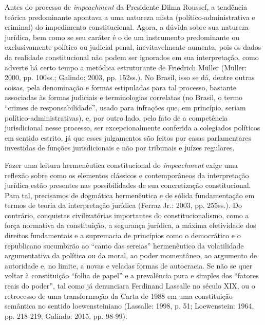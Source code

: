 Antes do processo de \emph{impeachment} da Presidente Dilma Roussef, a
tendência teórica predominante apontava a uma natureza mista
(político-administrativa e criminal) do impedimento constitucional.
Agora, a dúvida sobre sua natureza jurídica, bem como se seu caráter é o
de um instrumento predominante ou exclusivamente político ou judicial
penal, inevitavelmente aumenta, pois os dados da realidade
constitucional não podem ser ignorados em sua interpretação, como
adverte há certo tempo a metódica estruturante de Friedrich Müller
(Müller: 2000, pp. 100ss.; Galindo: 2003, pp. 152ss.). No Brasil, isso
se dá, dentre outras coisas, pela denominação e formas estipuladas para
tal processo, bastante associadas às formas judiciais e terminologias
correlatas (no Brasil, o termo ``crimes de responsabilidade'', usado
para infrações que, em princípio, seriam político-administrativas), e,
por outro lado, pelo fato de a competência jurisdicional nesse processo,
ser excepcionalmente conferida a colegiados políticos em sentido
estrito, já que esses julgamentos são feitos por casas parlamentares
investidas de funções jurisdicionais e não por tribunais e juízes
regulares.

Fazer uma leitura hermenêutica constitucional do \emph{impeachment}
exige uma reflexão sobre como os elementos clássicos e contemporâneos da
interpretação jurídica estão presentes nas possibilidades de sua
concretização constitucional. Para tal, precisamos de dogmática
hermenêutica e de sólida fundamentação em termos de teoria da
interpretação jurídica (Ferraz Jr.: 2003, pp. 255ss.). Do contrário,
conquistas civilizatórias importantes do constitucionalismo, como a
força normativa da constituição, a segurança jurídica, a máxima
efetividade dos direitos fundamentais e a supremacia de princípios como
o democrático e o republicano sucumbirão ao ``canto das sereias''
hermenêutico da volatilidade argumentativa da política ou da moral, ao
poder momentâneo, ao argumento de autoridade e, no limite, a novas e
veladas formas de autocracia. Se não se quer voltar à constituição
``folha de papel'' e a prevalência pura e simples dos ``fatores reais do
poder'', tal como já denunciara Ferdinand Lassalle no século XIX, ou o
retrocesso de uma transformação da Carta de 1988 em uma constituição
semântica no sentido loewensteiniano (Lassalle: 1998, p. 51;
Loewenstein: 1964, pp. 218-219; Galindo: 2015, pp. 98-99).

